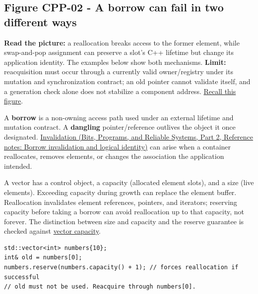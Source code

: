 \hypertarget{05-engine-i-ch003-when-a-valid-borrow-stops-naming-the-intended-thing}{}

\subsection{Figure CPP-02 - A borrow can fail in two different ways}\label{05-engine-i-ch003-figure-cpp-02---a-borrow-can-fail-in-two-different-ways}

\hypertarget{05-engine-i-ch003-figure-cpp-02---a-borrow-can-fail-in-two-different-ways}{}


\textbf{Read the picture:} a reallocation breaks access to the former element, while swap-and-pop assignment can preserve a slot's C++ lifetime but change its application identity. The examples below show both mechanisms. \textbf{Limit:} reacquisition must occur through a currently valid owner/registry under its mutation and synchronization contract; an old pointer cannot validate itself, and a generation check alone does not stabilize a component address. \hyperref[appendix-960160274237-four-figure-briefs]{Recall this figure}.

A \textbf{borrow} is a non-owning access path used under an external lifetime and mutation contract. A \textbf{dangling} pointer/reference outlives the object it once designated. \href{../01-Bits-Programs-and-Reliable-Systems-P02/main.pdf\#nameddest=appendix-f9b8b9188c7f}{Invalidation (Bits, Programs, and Reliable Systems, Part 2, Reference notes: Borrow invalidation and logical identity)} can arise when a container reallocates, removes elements, or changes the association the application intended.

A vector has a control object, a capacity (allocated element slots), and a size (live elements). Exceeding capacity during growth can replace the element buffer. Reallocation invalidates element references, pointers, and iterators; reserving capacity before taking a borrow can avoid reallocation up to that capacity, not forever. The distinction between size and capacity and the reserve guarantee is checked against \href{https://eel.is/c++draft/vector.capacity}{vector capacity}.

\begin{verbatim}
std::vector<int> numbers{10};
int& old = numbers[0];
numbers.reserve(numbers.capacity() + 1); // forces reallocation if successful
// old must not be used. Reacquire through numbers[0].
\end{verbatim}

